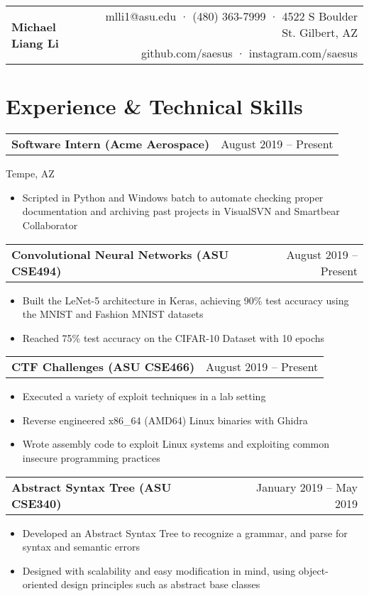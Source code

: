 \documentclass[10pt]{article}
\makeatletter
\newcommand{\headingtitle}[3]{
\begin{tabular*}{7in}{l@{\extracolsep{\fill}}r}
	\multirow{2}{*}{#1}&#2\\
	&#3\\
\end{tabular*}}
\newcommand{\subheadingt}[2]{ 	
	\begin{tabular*}{7in}{l@{\extracolsep{\fill}}r}
		\textbf{#1} & #2 \\
	\end{tabular*}}
\newcommand{\subheadingw}[3]{
	\begin{tabular*}{7in}{l@{\extracolsep{\fill}}r}
		\multirow{3}{*}#1\\
		&#2&{#3}\\
	\end{tabular*}}
\makeatother
\begin{document}
	
	
	\headingtitle{\textbf{\huge Michael Liang Li}}{mlli1@asu.edu · (480) 363-7999 · 4522 S Boulder St. Gilbert, AZ}{github.com/saesus · instagram.com/saesus}
	\vspace{-2em}
	
	\section{Experience \& Technical Skills}
		\subheadingt{Software Intern (Acme Aerospace)}{August 2019 – Present}
		Tempe, AZ\\
		\begin{itemize}[noitemsep, topsep=0pt]
			\item Scripted in Python and Windows batch to automate checking proper documentation and archiving past projects in VisualSVN and Smartbear Collaborator
		\end{itemize}
		\vspace{0.1in}
		
		\subheadingt{Convolutional Neural Networks (ASU CSE494)}{August 2019 –  Present}
		\begin{itemize}[noitemsep, topsep=0pt]
			\item Built the LeNet-5 architecture in Keras, achieving 90\% test accuracy using the MNIST and Fashion MNIST datasets 
			\item Reached 75\% test accuracy on the CIFAR-10 Dataset with 10 epochs
		\end{itemize}
		\vspace{0.1in}
		
		\subheadingt{CTF Challenges (ASU CSE466)}{August 2019 –  Present}
			\begin{itemize}[noitemsep, topsep=0pt]
				\item Executed a variety of exploit techniques in a lab setting 
				\item Reverse engineered x86\_64 (AMD64) Linux binaries with Ghidra
				\item Wrote assembly code to exploit Linux systems and exploiting common insecure programming practices
			\end{itemize}
		\vspace{0.1in}	
		
		\subheadingt{Abstract Syntax Tree (ASU CSE340)}{January 2019 – May 2019}
		\begin{itemize}[noitemsep, topsep=0pt]
			\item Developed an Abstract Syntax Tree to recognize a grammar, and parse for syntax and semantic errors
			\item Designed with scalability and easy modification in mind, using object-oriented design principles such as abstract base classes
		\end{itemize}
		\vspace{0.1in}
		
\end{document}
